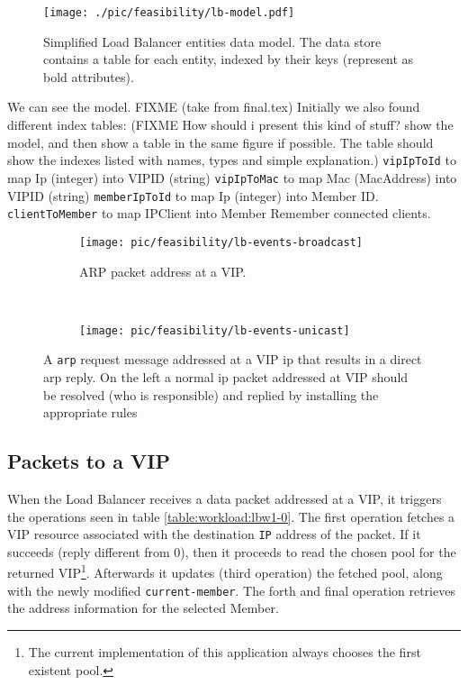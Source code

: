 \documentclass[12pt,openright,twoside]{report}
\begin{document}
\begin{figure}[H]
\centering 
\texttt{[image: ./pic/feasibility/lb-model.pdf]}
\caption{\small Simplified Load Balancer entities data model. The data
store contains a table for each entity, indexed by their keys (represent as bold attributes). }
\label{fig:lb-model}
\end{figure}

We can see the model. FIXME (take from final.tex) 
Initially we also found different index tables:  (FIXME How should i
present this kind of stuff? show the model, and then show a table in
the same figure if possible. The table should show the indexes listed
with names, types and simple explanation.) 
\texttt{vipIpToId} to map Ip (integer) into VIPID (string) 
\texttt{vipIpToMac} to map Mac (MacAddress) into VIPID (string) 
\texttt{memberIpToId} to map Ip (integer) into Member ID. 
\texttt{clientToMember} to map IPClient into Member  Remember
connected clients. 




\begin{figure}
  \centering
  \begin{subfigure}[b]{0.5\textwidth}
                \centering
                \texttt{[image: pic/feasibility/lb-events-broadcast]}
                \caption{ARP packet address at a VIP.}
                \label{fig:lb:interaction:arp2Vip}
        \end{subfigure}%
        ~
        \begin{subfigure}[b]{0.5\textwidth}
                \centering
                \texttt{[image: pic/feasibility/lb-events-unicast]}
                \caption{}
                \label{fig:lb:interaction:ip2Vip}
        \end{subfigure}
        \caption[Load Balancer workload events]{A \texttt{\gls{arp}} request message addressed at a VIP \gls{ip} that results in a direct \gls{arp} reply. On the left a normal \gls{ip} packet addressed at VIP should be resolved (who is responsible) and replied by installing the appropriate rules}  
        \label{fig:lb:interaction}
\end{figure}

\subsection{Packets to a VIP}
When the Load Balancer  receives a data packet addressed
at a VIP, it triggers the operations seen in table
\ref{table:workload:lbw1-0}. 
The first operation fetches a VIP resource associated with the
destination \texttt{IP} address of the packet.
If it succeeds (reply different from 0), then it proceeds to read 
the chosen pool for the returned  VIP\footnote{The current implementation of this
application always chooses the first existent pool.}.
Afterwards it updates (third operation) the fetched  pool, along with the newly modified
\texttt{current-member}.
The forth and final operation retrieves
the address information for the selected  Member. 
\end{document}
